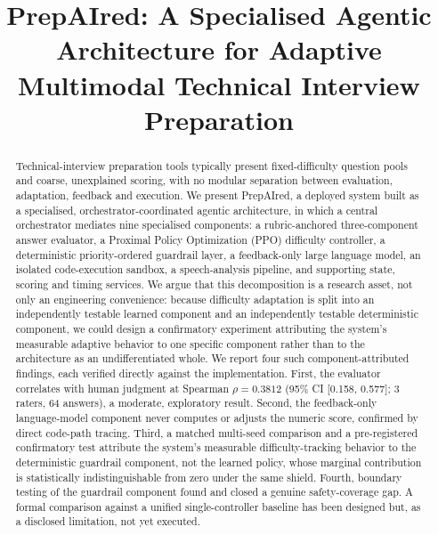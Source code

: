 \documentclass[conference]{IEEEtran}
\begin{document}
\title{PrepAIred: A Specialised Agentic Architecture for Adaptive Multimodal Technical Interview Preparation}

\author{
}

\maketitle

\begin{abstract}
Technical-interview preparation tools typically present fixed-difficulty question pools and coarse, unexplained scoring, with no modular separation between evaluation, adaptation, feedback and execution. We present PrepAIred, a deployed system built as a specialised, orchestrator-coordinated agentic architecture, in which a central orchestrator mediates nine specialised components: a rubric-anchored three-component answer evaluator, a Proximal Policy Optimization (PPO) difficulty controller, a deterministic priority-ordered guardrail layer, a feedback-only large language model, an isolated code-execution sandbox, a speech-analysis pipeline, and supporting state, scoring and timing services. We argue that this decomposition is a research asset, not only an engineering convenience: because difficulty adaptation is split into an independently testable learned component and an independently testable deterministic component, we could design a confirmatory experiment attributing the system's measurable adaptive behavior to one specific component rather than to the architecture as an undifferentiated whole. We report four such component-attributed findings, each verified directly against the implementation. First, the evaluator correlates with human judgment at Spearman $\rho = 0.3812$ (95\% CI [0.158, 0.577]; 3 raters, 64 answers), a moderate, exploratory result. Second, the feedback-only language-model component never computes or adjusts the numeric score, confirmed by direct code-path tracing. Third, a matched multi-seed comparison and a pre-registered confirmatory test attribute the system's measurable difficulty-tracking behavior to the deterministic guardrail component, not the learned policy, whose marginal contribution is statistically indistinguishable from zero under the same shield. Fourth, boundary testing of the guardrail component found and closed a genuine safety-coverage gap. A formal comparison against a unified single-controller baseline has been designed but, as a disclosed limitation, not yet executed.
\end{abstract}
\end{document}

